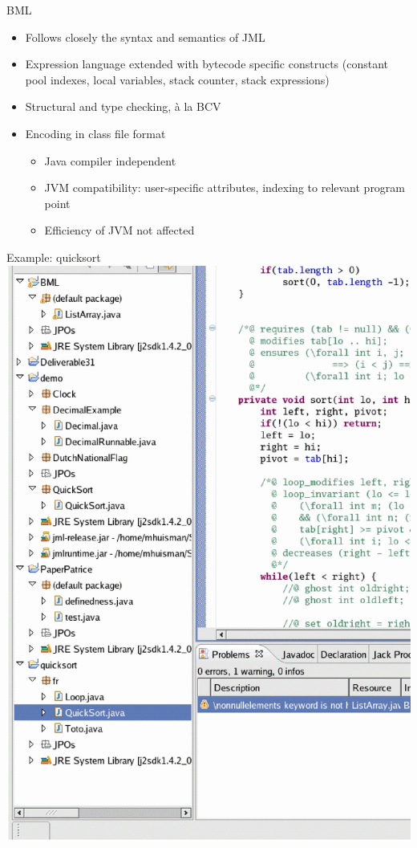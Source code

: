 \documentclass[final,nocolorBG,a4,mobius,nototal,pdf,slideColor]{prosper}
\begin{document}
\begin{slide}{BML}
 \begin{itemize}
 \item Follows closely the syntax and semantics of JML
 \item Expression language extended with bytecode specific constructs
(constant pool indexes, local variables, stack counter, stack 
expressions)
 \item Structural and type checking, \`a la BCV
 \item Encoding in class file format
  \begin{itemize}
   \item Java compiler independent 
   \item JVM compatibility: user-specific attributes, indexing to
relevant program point
   \item Efficiency of JVM not affected
  \end{itemize}
 \end{itemize}
\end{slide} 

\begin{slide}{Example: quicksort}
\vspace*{-1.5em}
\includegraphics[height=\textheight]{screen13.ps}
\end{slide}
\end{document}
